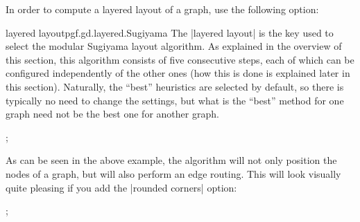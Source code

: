 In order to compute a layered layout of a graph, use the following option:

\begin{gdalgorithm}{layered layout}{pgf.gd.layered.Sugiyama}
  The |layered layout| is the key used to select the modular Sugiyama
  layout algorithm. As explained in the overview of this section, this
  algorithm consists of five consecutive steps, each of which can be
  configured independently of the other ones (how this is done is
  explained later in this section). Naturally, the ``best'' heuristics
  are selected by default, so there is typically no need to change the
  settings, but what is the ``best'' method for one graph need not be
  the best one for another graph.
  
\begin{codeexample}[]
\tikz {};    
\end{codeexample}

  As can be seen in the above example, the algorithm will not only
  position the nodes of a graph, but will also perform an edge
  routing. This will look visually quite pleasing if you add the
  |rounded corners| option:

\begin{codeexample}[]
 ;    
\end{codeexample}


\end{gdalgorithm}



